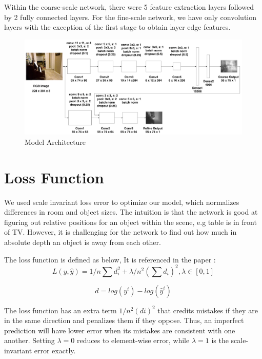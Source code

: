 \documentclass{article}
\begin{document}
    Within the coarse-scale network, there were 5 feature extraction layers followed by 2 fully connected layers. For the fine-scale network, we have only convolution layers with the exception of the first stage to obtain layer edge features.

\begin{figure}[t]
    \centering
    \includegraphics[width=1.0\textwidth]{images/arch-full.png}
    \caption{Model Architecture}
    \label{fig:arch-full}
\end{figure}

\section{Loss Function}
    We used scale invariant loss error to optimize our model, which normalizes differences in room and object sizes. The intuition is that the network is good at figuring out relative positions for an object within the scene, e.g table is in front of TV. However, it is challenging for the network to find out how much in absolute depth an object is away from each other. 
    
    The loss function is defined as below, It is referenced in the paper \cite{nips-1}:
\begin{equation}
    L(y, \hat{y}) = 1/n \sum d_{i}^{2} + \lambda/n^2 (\sum d_{i})^2 , 
    \lambda\in [0, 1]
\end{equation}

\begin{equation}
    d = log(y^{i}) - log(\hat{y}^{i})
\end{equation}

    The loss function has an extra term $1/n^2 (di)^2$ that credits mistakes if they are in the same direction and penalizes them if they oppose. Thus, an imperfect prediction will have lower error when its mistakes are consistent with one another. Setting $\lambda = 0$ reduces to element-wise error, while $\lambda = 1$ is the scale-invariant error exactly.
    
\end{document}
